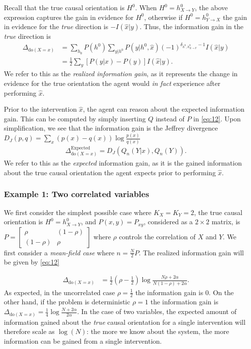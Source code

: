 \documentclass[letterpaper]{article} %
\newcommand{\doo}{\textrm{do}}
\begin{document}
Recall that the true causal orientation is $H^0$. When $H^0 = h^0_{X \rightarrow Y}$, the above expression captures the gain in evidence for $H^0$, otherwise if $H^0 = h^0_{Y \rightarrow X}$ the gain in evidence for the \emph{true} direction is $-I(\hat x | y)$. Thus, the information gain in the \emph{true} direction is
\begin{align}
\Delta_{ \doo(X=x) } & = \sum_{h_0} P(h^0) \sum_{y | h^0} P(y | h^0, \hat x ) (-1)^{ \delta_{h^0, h^0_{X \rightarrow Y} } - 1 } I(\hat x | y) \nonumber \\
& = \frac{1}{2} \sum_{y} \left[P(y | x) - P(y)   \right]  I(\hat x | y).   \label{eq:12}
\end{align}
We refer to this as the \emph{realized information gain}, as it represents the change in evidence for the true orientation the agent would \emph{in fact} experience after performing $\hat x$. 

Prior to the intervention $\hat x$, the agent can reason about the expected information gain. This can be computed by simply inserting $Q$ instead of $P$ in \cref{eq:12}. Upon simplification, we see that the information gain is the Jeffrey divergence $D_J(p,q) = \sum_{x} (p(x)-q(x))\log \frac{p(x)}{q(x)}$
\begin{align}
\Delta^\text{Expected}_{\doo(X=x)} = D_J( Q_n(Y | x), Q_n(Y) ).
\label{eq:9}
\end{align}
We refer to this as the \emph{expected} information gain, as it is the gained information about the true causal orientation the agent expects prior to performing $\hat x$. 



\subsubsection{Example 1: Two correlated variables}
We first consider the simplest possible case where $K_X = K_Y = 2$, the true causal orientation is $H^0 = h^0_{X\rightarrow Y}$, and $P(x,y)=P_{xy}$, considered as a $2 \times 2$ matrix, is
$ P = \begin{bmatrix}
	\rho  & (1-\rho) \\
	(1-\rho) & \rho 
\end{bmatrix} $
 where $\rho$ controls the correlation of $X$ and $Y$. We first consider a \emph{mean-field case} where $n = \frac{N}{2}P$. The realized information gain will be given by \cref{eq:12}

\begin{align}
\Delta_{\doo(X=x) } & = \frac{1}{2}
(\rho-\frac{1}{2} ) \log \frac{ N \rho + 2\alpha }{ N(1-\rho) + 2\alpha }. %
\end{align}
As expected, in the uncorrelated case $\rho= \frac{1}{2}$ the information gain is 0. On the other hand, if the problem is deterministic $\rho = 1$ the information gain is $\Delta_{\doo(X=x) } = \frac{1}{4}\log \frac{ N + 2\alpha }{ 2\alpha}$. In the case of two variables, the expected amount of information gained about the \emph{true} causal orientation for a single intervention will therefore scale as $\log(N)$: the more we know about the system, the more information can be gained from a single intervention. 
\end{document}

